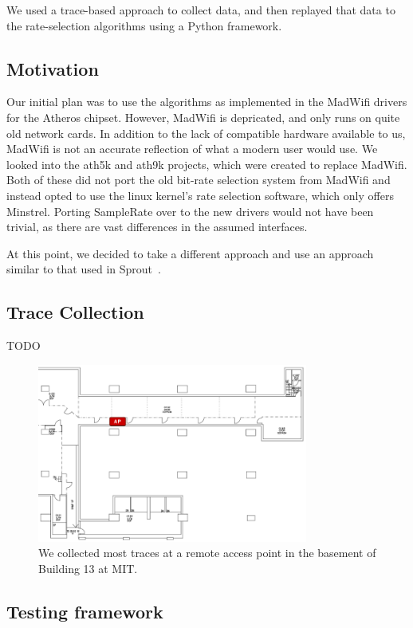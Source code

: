 \documentclass[letterpaper,twocolumn,10pt]{article}
\begin{document}
We used a trace-based approach to collect data, and then replayed that data to the rate-selection algorithms using a Python framework.

\subsection{Motivation}

Our initial plan was to use the algorithms as implemented in the MadWifi drivers for the Atheros chipset. However, MadWifi is depricated, and only runs on quite old network cards. In addition to the lack of compatible hardware available to us, MadWifi is not an accurate reflection of what a modern user would use. We looked into the ath5k and ath9k projects, which were created to replace MadWifi. Both of these did not port the old bit-rate selection system from MadWifi and instead opted to use the linux kernel's rate selection software, which only offers Minstrel. Porting SampleRate over to the new drivers would not have been trivial, as there are vast differences in the assumed interfaces. 

At this point, we decided to take a different approach and use an approach similar to that used in Sprout~\cite{sprout}.


\subsection{Trace Collection}

TODO

\begin{figure}[hbt]
  \hspace{-0.5em}\includegraphics[width=3.5in]{bsmt13floorplan.png}\vspace{-0em}
  \caption{We collected most traces at a remote access point in the basement of Building 13 at MIT.}
\label{figure:1}
\end{figure}

\subsection{Testing framework}
\end{document}
